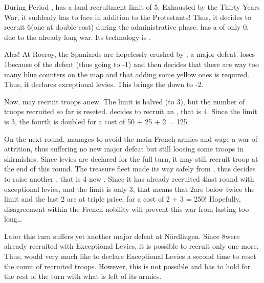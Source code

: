 \begin{exemple}
  During Period , \HIS has a land recruitment limit of
  5\LD. Exhausted by the Thirty Years War, it suddenly has to face \FRA in
  addition to the Protestants! Thus, it decides to recruit 6\LD (one at double
  cost) during the administrative phase. \HIS has a \STAB of only 0, due to
  the already long war. Its technology is \TBAR.
  
  Alas! At Rocroy, the Spaniards are hopelessly crushed by , a major defeat. \HIS loses 1\STAB because of the defeat (thus
  going to -1) and then decides that there are way too many blue counters on
  the map and that adding some yellow ones is required. Thus, it declares
  exceptional levies. This brings the \STAB down to -2.

  Now, \HIS may recruit troops anew. The limit is halved (to 3\LD), but the
  number of troops recruited so far is reseted. \HIS decides to recruit an
  \ARMY\Faceplus, that is 4\LD. Since the limit is 3\LD, the fourth is doubled
  for a cost of 50 + 25 + 2  = 125\ducats. 

  \smallskip

  On the next round, \HIS manages to avoid the main French armies and wage a
  war of attrition, thus suffering no new major defeat but still loosing some
  troops in skirmishes. Since levies are declared for the full turn, it may
  still recruit troop at the end of this round. The treasure fleet made its
  way safely from \continentAmerica, thus \HIS decides to raise another
  \ARMY\Faceplus, that is 4 new \LD. Since it has already recruited 4\LD last
  round with exceptional levies, and the limit is only 3\LD, that means that
  2\LD are below twice the limit and the last 2 are at triple price, for a
  cost of 2  + 3  = 250\ducats! Hopefully,
  disagreement within the French nobility will prevent this war from lasting
  too long\ldots

  \smallskip

  Later this turn \HIS suffers yet another major defeat at
  N\"{o}rdlingen. Since 8\LD were already recruited with Exceptional Levies,
  it is possible to recruit only one more. Thus, \HIS would very much like to
  declare Exceptional Levies a second time to reset the count of recruited
  troops. However, this is not possible and \HIS has to hold for the rest of
  the turn with what is left of its armies.
\end{exemple}

